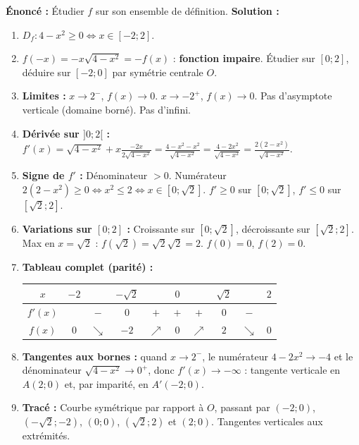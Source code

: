 \documentclass[11pt]{article}
\begin{document}
\begin{exoresolu}[Étude complète : Fonction irrationnelle $f(x) = x\sqrt{4-x^2}$]
\textbf{Énoncé :} Étudier $f$ sur son ensemble de définition.
\tcblower
\textbf{Solution :}
\begin{enumerate}
  \item $D_f : 4-x^2 \ge 0 \iff x \in [-2; 2]$.
  \item $f(-x) = -x\sqrt{4-x^2} = -f(x)$ : \textbf{fonction impaire}. Étudier sur $[0;2]$, déduire sur $[-2;0]$ par symétrie centrale $O$.
  \item \textbf{Limites :} $x \to 2^-$, $f(x) \to 0$. $x \to -2^+$, $f(x) \to 0$. Pas d'asymptote verticale (domaine borné). Pas d'infini.
  \item \textbf{Dérivée sur $]0;2[$ :} $f'(x) = \sqrt{4-x^2} + x \frac{-2x}{2\sqrt{4-x^2}} = \frac{4-x^2 - x^2}{\sqrt{4-x^2}} = \frac{4-2x^2}{\sqrt{4-x^2}} = \frac{2(2-x^2)}{\sqrt{4-x^2}}$.
  \item \textbf{Signe de $f'$ :} Dénominateur $>0$. Numérateur $2(2-x^2) \ge 0 \iff x^2 \le 2 \iff x \in [0;\sqrt{2}]$.
    $f' \ge 0$ sur $[0;\sqrt{2}]$, $f' \le 0$ sur $[\sqrt{2};2]$.
  \item \textbf{Variations sur $[0;2]$ :} Croissante sur $[0;\sqrt{2}]$, décroissante sur $[\sqrt{2};2]$.
    Max en $x=\sqrt{2}$ : $f(\sqrt{2}) = \sqrt{2}\sqrt{2} = 2$.
    $f(0)=0$, $f(2)=0$.
  \item \textbf{Tableau complet (parité) :}
  \begin{center}
  \begin{tabular}{|c|ccccccccc|}
  \hline
  $x$ & $-2$ & & $-\sqrt{2}$ & & $0$ & & $\sqrt{2}$ & & $2$ \\
  \hline
  $f'(x)$ & & $-$ & $0$ & $+$ & $+$ & $+$ & $0$ & $-$ & \\
  \hline
  $f(x)$ & $0$ & $\searrow$ & $-2$ & $\nearrow$ & $0$ & $\nearrow$ & $2$ & $\searrow$ & $0$ \\
  \hline
  \end{tabular}
  \end{center}
  \item \textbf{Tangentes aux bornes :} quand $x \to 2^-$, le numérateur $4-2x^2 \to -4$ et le dénominateur $\sqrt{4-x^2}\to 0^+$, donc $f'(x)\to -\infty$ : tangente verticale en $A(2;0)$ et, par imparité, en $A'(-2;0)$.
  \item \textbf{Tracé :} Courbe symétrique par rapport à $O$, passant par $(-2;0)$, $(-\sqrt{2};-2)$, $(0;0)$, $(\sqrt{2};2)$ et $(2;0)$. Tangentes verticales aux extrémités.
\end{enumerate}
\end{exoresolu}
\end{document}
